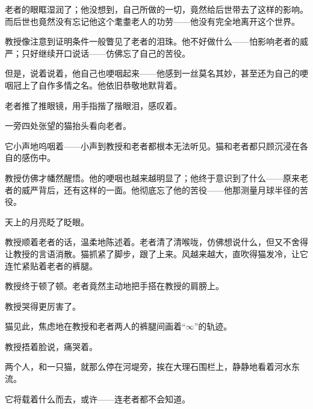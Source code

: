 老者的眼眶湿润了；他没想到，自己所做的一切，竟然给后世带去了这样的影响。而后世也竟然没有忘记他这个耄耋老人的功劳——他没有完全地离开这个世界。

教授像注意到证明条件一般瞥见了老者的泪珠。他不好做什么——怕影响老者的威严；只好继续开口说话——仿佛忘了自己的苦役。

但是，说着说着，他自己也哽咽起来——他感到一丝莫名其妙，甚至还为自己的哽咽冠上了自作多情之名。他依旧恭敬地默背着。


老者推了推眼镜，用手指揩了揩眼泪，感叹着。


一旁四处张望的猫抬头看向老者。

它小声地呜咽着——小声到教授和老者都根本无法听见。猫和老者都只顾沉浸在各自的感伤中。

教授仿佛才幡然醒悟。他的哽咽也越来越明显了；他终于意识到了什么——原来老者的威严背后，还有这样的一面。他彻底忘了他的苦役——他那测量月球半径的苦役。

天上的月亮眨了眨眼。


教授顺着老者的话，温柔地陈述着。老者清了清喉咙，仿佛想说什么，但又不舍得让教授的言语消散。猫抓紧了脚步，跟了上来。风越来越大，直吹得猫发冷，让它连忙紧贴着老者的裤腿。


教授终于顿了顿。老者竟然主动地把手搭在教授的肩膀上。


教授哭得更厉害了。

猫见此，焦虑地在教授和老者两人的裤腿间画着“\(\infty\)”的轨迹。

教授捂着脸说，痛哭着。

两个人，和一只猫，就那么停在河堤旁，挨在大理石围栏上，静静地看着河水东流。

它将载着什么而去，或许——连老者都不会知道。



